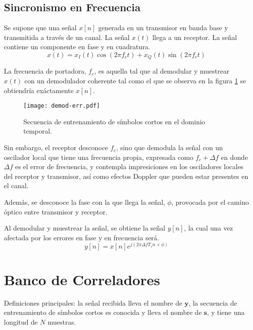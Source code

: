 \subsection{Sincronismo en Frecuencia}
\label{Ss:ch3-sincronismo-frecuencia}

Se supone que una señal $x[n]$ generada en un transmisor en banda base y transmitida a través de un canal. La señal $x(t)$ llega a un receptor. La señal contiene un componente en fase y en cuadratura. 
\begin{equation}
    x(t) = x_I(t)\cos(2\pi f_c t) + x_Q(t)\sin(2\pi f_c t)
\end{equation}

La frecuencia de portadora, $f_c$, es aquella tal que al demodular y muestrear $x(t)$ con un demodulador coherente tal como el que se observa en la figura \ref{fig:demod-err} se obtiendría exáctamente $x[n]$.

\begin{figure}[ht]
    \centering{}\texttt{[image: demod-err.pdf]}
    \caption{Secuencia de entrenamiento de símbolos cortos en el dominio temporal.\label{fig:demod-err}}  
\end{figure}

Sin embargo, el receptor desconoce $f_c$, sino que demodula la señal con un oscilador local que tiene una frecuencia propia, expresada como $f_c+\Delta f$ en donde $\Delta f$ es el error de frecuencia, y contempla impresiciones en los osciladores locales del receptor y transmisor, así como efectos Doppler que pueden estar presentes en el canal.

Además, se desconoce la fase con la que llega la señal, $\phi$, provocada por el camino óptico entre transmisor y receptor.

Al demodular y muestrear la señal, se obtiene la señal $y[n]$, la cual una vez afectada por los errores en fase y en frecuencia será.\\
\begin{equation}
    y[n] = x[n] e^{j(2\pi\Delta f T_s n + \phi)}
\end{equation}


\section{Banco de Correladores}
\label{S:ch3-banco}

Definiciones principales: la señal recibida lleva el nombre de $\mathbf{y}$, la secuencia de entrenamiento de símbolos cortos es conocida y lleva el nombre de $\mathbf{s}$, y tiene una longitud de $N$ muestras.

